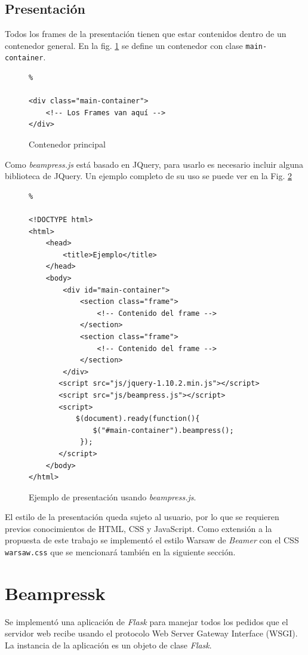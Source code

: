 		\subsection{Presentación} %
		\label{sub:presentacion}
			Todos los frames de la presentación tienen que estar contenidos dentro de un contenedor general. En la fig. \ref{fig:main_container} se define un contenedor con clase \texttt{main-container}.
		
			\begin{figure}[htb]%
				\begin{lstlisting}%

<div class="main-container">
	<!-- Los Frames van aquí -->
</div>
				\end{lstlisting}
			\caption{Contenedor principal}
			\label{fig:main_container}
			\end{figure}				


			Como \textit{beampress.js} está basado en JQuery, para usarlo es necesario incluir alguna biblioteca de JQuery. Un ejemplo completo de su uso se puede ver en la Fig. \ref{fig:ex5}

			\begin{figure}[htb]%
				\begin{lstlisting}%

<!DOCTYPE html>
<html>
	<head>
    	<title>Ejemplo</title>
	</head>
	<body>
		<div id="main-container">
			<section class="frame">
				<!-- Contenido del frame -->
			</section>
			<section class="frame">
				<!-- Contenido del frame -->
			</section>						
		</div>
	   <script src="js/jquery-1.10.2.min.js"></script>
	   <script src="js/beampress.js"></script>
	   <script>
	       $(document).ready(function(){     
	           $("#main-container").beampress();
	        });
	   </script>		
	</body>
</html>			
				\end{lstlisting}
			\caption{
				Ejemplo de presentación usando \textit{beampress.js}. 
				\label{fig:ex5} }
			\end{figure}	

			El estilo de la presentación queda sujeto al usuario, por lo que se requieren previos conocimientos de HTML, CSS y JavaScript. Como extensión a la propuesta de este trabajo se implementó el estilo Warsaw de \textit{Beamer} con el CSS \texttt{warsaw.css} que se mencionará también en la siguiente sección.

	\section{Beampressk} %
	\label{sec:beampressk_imp}
		Se implementó una aplicación de \textit{Flask} para manejar todos los pedidos que el servidor web recibe usando el protocolo Web Server Gateway Interface (WSGI). La instancia de la aplicación es un objeto de clase \textit{Flask}.

